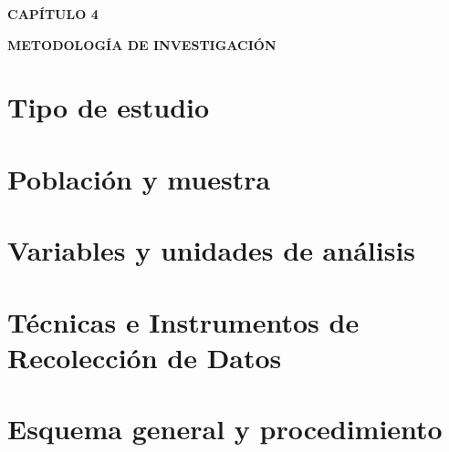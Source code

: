 \setcounter{chapter}{4}
\setcounter{section}{0} 
{\centering
{\large\bfseries CAPÍTULO 4}\par\vspace{0.3cm}
{\Large\bfseries METODOLOGÍA DE INVESTIGACIÓN}\par}
\vspace{1cm}

\section{Tipo de estudio}
\section{Población y muestra}
\section{Variables y unidades de análisis}
\section{Técnicas e Instrumentos de Recolección de Datos}
\section{Esquema general y procedimiento}